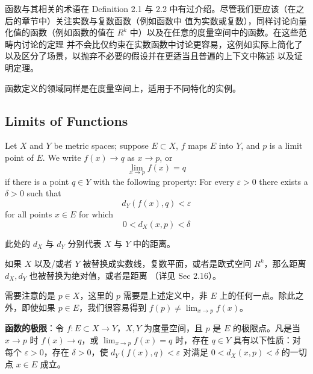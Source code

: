 \documentclass[../poma-notes.tex]{subfiles}
\begin{document}
函数与其相关的术语在 Definition 2.1 与 2.2 中有过介绍。尽管我们更应该（在之后的章节中）关注实数与复数函数（例如函数中
值为实数或复数），同样讨论向量化值的函数（例如函数的值在 $R^k$ 中）以及在任意的度量空间中的函数。在这些范畴内讨论的定理
并不会比仅约束在实数函数中讨论更容易，这例如实际上简化了以及区分了场景，以抛弃不必要的假设并在更适当且普遍的上下文中陈述
以及证明定理。

函数定义的领域同样是在度量空间上，适用于不同特化的实例。

\subsection*{Limits of Functions}

\begin{definition}
  Let $X$ and $Y$ be metric spaces; suppose $E \subset X$, $f$ maps $E$ into $Y$, and $p$ is a limit
  point of $E$. We write $f(x) \to q$ as $x \to p$, or
  \begin{equation}
    \lim_{x \to p} f(x) = q
  \end{equation}
  if there is a point $q \in Y$ with the following property: For every $\varepsilon > 0$ there exists a
  $\delta > 0$ such that
  \begin{equation}
    d_Y(f(x),q) < \varepsilon
  \end{equation}
  for all points $x \in E$ for which
  \begin{equation}
    0 < d_X(x,p) < \delta
  \end{equation}
\end{definition}

此处的 $d_X$ 与 $d_Y$ 分别代表 $X$ 与 $Y$ 中的距离。

如果 $X$ 以及/或者 $Y$ 被替换成实数线，复数平面，或者是欧式空间 $R^k$，那么距离 $d_X, d_Y$ 也被替换为绝对值，或者是距离
（详见 Sec 2.16）。

需要注意的是 $p \in X$，这里的 $p$ 需要是上述定义中，非 $E$ 上的任何一点。除此之外，即使如果 $p \in E$，我们很容易得到
$f(p) \ne \lim_{x \to p} f(x)$。

\begin{anote}
  \textbf{函数的极限}：令 $f: E \subset X \to Y$，$X, Y$ 为度量空间，且 $p$ 是 $E$ 的极限点。凡是当 $x \to p$ 时
  $f(x) \to q$，或 $\lim_{x \to p} f(x) = q$ 时，存在 $q \in Y$ 具有以下性质：对每个 $\varepsilon > 0$，存在
  $\delta > 0$，使 $d_Y(f(x),q) < \varepsilon$ 对满足 $0 < d_X(x, p) < \delta$ 的一切点 $x \in E$ 成立。
\end{anote}
\end{document}
